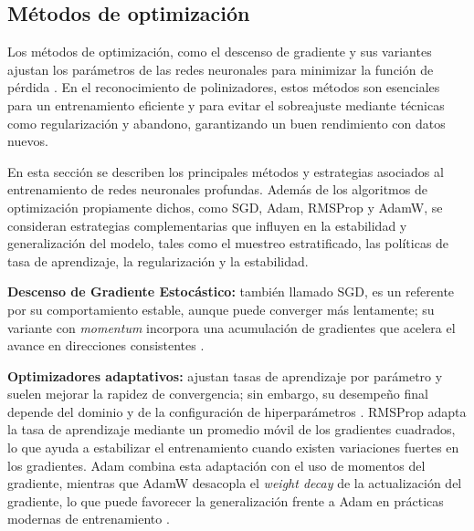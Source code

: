 \vspace{-1.0cm}
\subsection{Métodos de optimización}

Los métodos de optimización, como el descenso de gradiente y sus variantes ajustan los parámetros de las redes neuronales para minimizar la función de pérdida \parencite{rudenko2020optimization}. En el reconocimiento de polinizadores, estos métodos son esenciales para un entrenamiento eficiente y para evitar el sobreajuste mediante técnicas como regularización y
abandono, garantizando un buen rendimiento con datos nuevos.

En esta sección se describen los principales métodos y estrategias asociados al entrenamiento de redes neuronales profundas. Además de los algoritmos de optimización propiamente dichos, como SGD, Adam, RMSProp y AdamW, se consideran estrategias complementarias que influyen en la estabilidad y generalización del modelo, tales como el muestreo estratificado, las políticas de tasa de aprendizaje, la regularización y la estabilidad. 

\par\indent\textbullet\hspace{0.2cm} \textbf{Descenso de Gradiente Estocástico:} también llamado SGD, es un referente por su comportamiento estable, aunque puede converger más lentamente; su variante con \textit{momentum} incorpora una acumulación de gradientes que acelera el avance en direcciones consistentes \parencite{Postalcloǧlu2020,Sudewo2025}. 

\par\indent\textbullet\hspace{0.2cm} \textbf{Optimizadores adaptativos:} ajustan tasas de aprendizaje por parámetro y suelen mejorar la rapidez de convergencia; sin embargo, su desempeño final depende del dominio y de la configuración de hiperparámetros \parencite{Postalcloǧlu2020,Azis2025}. RMSProp adapta la tasa de aprendizaje mediante un promedio móvil de los gradientes cuadrados, lo que ayuda a estabilizar el entrenamiento cuando existen variaciones fuertes en los gradientes. Adam combina esta adaptación con el uso de momentos del gradiente, mientras que AdamW desacopla el \textit{weight decay} de la actualización del gradiente, lo que puede favorecer la generalización frente a Adam en prácticas modernas de entrenamiento \parencite{Azis2025,Sudewo2025}.

